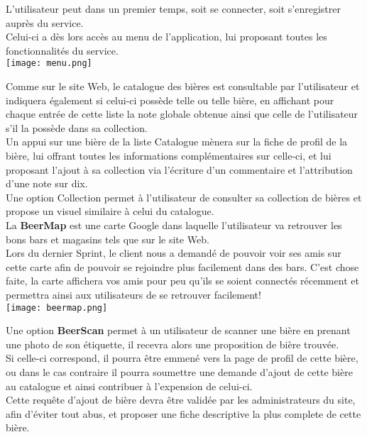 \documentclass{report}
\begin{document}
		L'utilisateur peut dans un premier temps, soit se connecter, soit s'enregistrer auprès du service.\\

		Celui-ci a dès lors accès au menu de l'application, lui proposant toutes les fonctionnalités du service.\\

		\texttt{[image: menu.png]}

		Comme sur le site Web, le catalogue des bières est consultable par l'utilisateur et indiquera également si celui-ci possède telle ou telle bière, en affichant pour chaque entrée de cette liste la note globale obtenue ainsi que celle de l'utilisateur s'il la possède dans sa collection.\\

		Un appui sur une bière de la liste Catalogue mènera sur la fiche de profil de la bière, lui offrant toutes les informations complémentaires sur celle-ci, et lui proposant l'ajout à sa collection via l'écriture d'un commentaire et l'attribution d'une note sur dix.\\


		Une option Collection permet à l'utilisateur de consulter sa collection de bières et propose un visuel similaire à celui du catalogue.\\


		La \textbf{BeerMap} est une carte Google dans laquelle l'utilisateur va retrouver les bons bars et magasins tels que sur le site Web.\\
		Lors du dernier Sprint, le client nous a demandé de pouvoir voir ses amis sur cette carte afin de pouvoir se rejoindre plus facilement dans des bars. C'est chose faite, la carte affichera vos amis pour peu qu'ils se soient connectés récemment et permettra ainsi aux utilisateurs de se retrouver facilement!\\

		\texttt{[image: beermap.png]}


		Une option \textbf{BeerScan} permet à un utilisateur de scanner une bière en prenant une photo de son étiquette, il recevra alors une proposition de bière trouvée.\\
		Si celle-ci correspond, il pourra être emmené vers la page de profil de cette bière, ou dans le cas contraire il pourra soumettre une demande d'ajout de cette bière au catalogue et ainsi contribuer à l'expension de celui-ci.\\
		Cette requête d'ajout de bière devra être validée par les administrateurs du site, afin d'éviter tout abus, et proposer une fiche descriptive la plus complete de cette bière.\\
\end{document}
